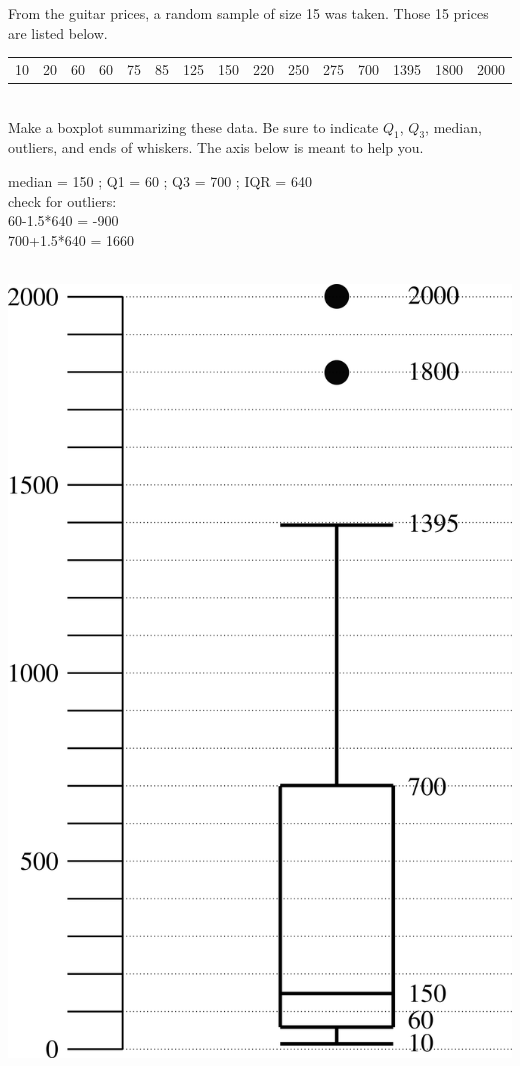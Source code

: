 \documentclass[12pt,letterpaper,addpoints,answers]{exam}
\begin{document}
\begin{questions}
\newpage

\question[8] From the guitar prices, a random sample of size 15 was taken. Those 15 prices are listed below.

\begin{center}
\begin{tabular}{c c c c c c c c c c c c c c c}
10&20&60&60&75&85&125&150&220&250&275&700&1395&1800&2000
\end{tabular}
\end{center}

\\
Make a boxplot summarizing these data. Be sure to indicate $Q_1$, $Q_3$, median, outliers, and ends of whiskers. The axis below is meant to help you. 

\begin{solution}
median = 150 ; Q1 = 60 ; Q3 = 700 ; IQR = 640 \\
check for outliers:
\\ 60-1.5*640 = -900
\\ 700+1.5*640 = 1660
\end{solution}
\vfill 
\\ \hfill
\includegraphics[scale=0.7]{figures/boxplot_axis_answer.png}



\end{questions}
\end{document}
